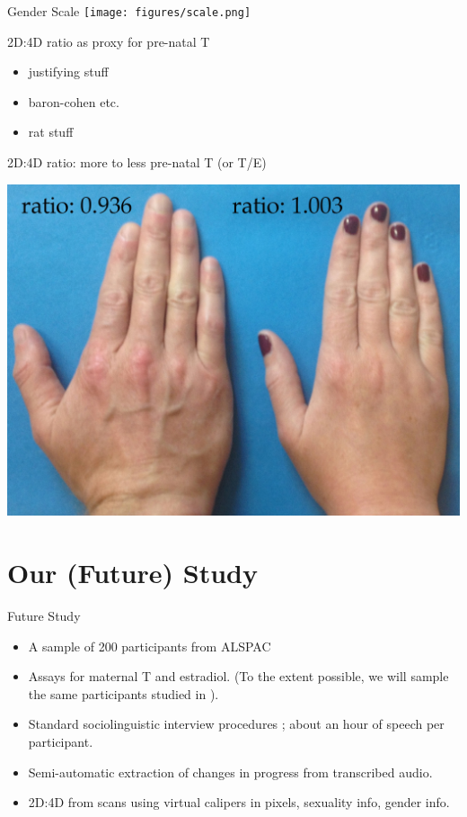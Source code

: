 \documentclass[hyperref={pdfpagelabels=false}]{beamer}
\begin{document}
\begin{frame}{Gender Scale}
	\texttt{[image: figures/scale.png]}
\end{frame}

\begin{frame}{2D:4D ratio as proxy for pre-natal T}
\begin{itemize}
	\item justifying stuff
	\item baron-cohen etc.
	\item rat stuff
\end{itemize}
\end{frame}

\begin{frame}{2D:4D ratio: more to less pre-natal T (or T/E)}
\begin{center}
	\includegraphics[width=1.12\textwidth]{figures/realhands2.jpg}
\end{center}
\end{frame}


\section{Our (Future) Study}

\begin{frame}{Future Study}
\begin{itemize}
	\item A sample of 200 participants from ALSPAC
	\item Assays for maternal T and estradiol. (To the extent possible, we will sample the same participants studied in \citealt{hinesetal2002}). 
	\item Standard sociolinguistic interview procedures \citep{tagliamonte2006}; about an hour of speech per participant.
	\item Semi-automatic extraction of changes in progress from transcribed audio.
	\item 2D:4D from scans using virtual calipers in pixels, sexuality info, gender info.
\end{itemize}
\end{frame}
\end{document}

